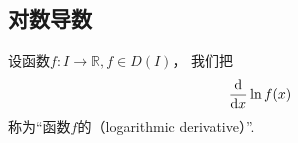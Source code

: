 \subsection{对数导数}
\begin{definition}
设函数\(f\colon I \to \mathbb{R}, f \in D(I)\)，
我们把\[
	\dv{x} \ln f(x)
\]称为“函数\(f\)的（logarithmic derivative）”.
\end{definition}
